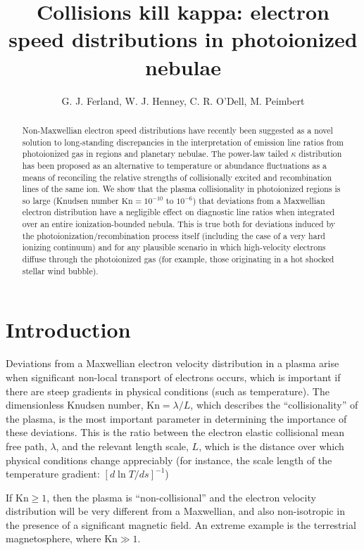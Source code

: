 \documentclass{emulateapj}
\newcommand\Kn{\ensuremath{\mathrm{Kn}}}
\newcommand\hii{\ion{H}{2}}
\begin{document}
\title{Collisions kill kappa: electron speed distributions in
  photoionized nebulae}

\author{G. J. Ferland, W. J. Henney, C. R. O'Dell, M. Peimbert}

\begin{abstract}
  Non-Maxwellian electron speed distributions have recently been
  suggested as a novel solution to long-standing discrepancies in the
  interpretation of emission line ratios from photoionized gas in
  \hii{} regions and planetary nebulae.  The power-law tailed
  \(\kappa\)
  distribution has been proposed as an alternative to temperature or
  abundance fluctuations as a means of reconciling the relative
  strengths of collisionally excited and recombination lines of the
  same ion.  We show that the plasma collisionality in photoionized
  regions is so large (Knudsen number \(\Kn = 10^{-10}\)
  to \( 10^{-6}\))
  that deviations from a Maxwellian electron distribution have a
  negligible effect on diagnostic line ratios when integrated over an
  entire ionization-bounded nebula.  This is true both for deviations
  induced by the photoionization/recombination process itself
  (including the case of a very hard ionizing continuum) and for any
  plausible scenario in which high-velocity electrons diffuse through
  the photoionized gas (for example, those originating in a hot
  shocked stellar wind bubble). 
\end{abstract}

\section{Introduction}
\label{sec:introduction}

Deviations from a Maxwellian electron velocity distribution in a
plasma arise when significant non-local transport of electrons occurs,
which is important if there are steep gradients in physical conditions
(such as temperature).  The dimensionless Knudsen number,
\(\Kn = \lambda / L\),
which describes the ``collisionality'' of the plasma, is the most
important parameter in determining the importance of these deviations.
This is the ratio between the electron elastic collisional mean free
path, \(\lambda\),
and the relevant length scale, \(L\),
which is the distance over which physical conditions change
appreciably (for instance, the scale length of the temperature
gradient: \([d \ln T / d s]^{-1}\))

If \(\Kn \ge 1\), then the plasma is ``non-collisional'' and the
electron velocity distribution will be very different from a
Maxwellian, and also non-isotropic in the presence of a significant
magnetic field.  An extreme example is the terrestrial magnetosphere,
where \(\Kn \gg 1\).  
\end{document}

